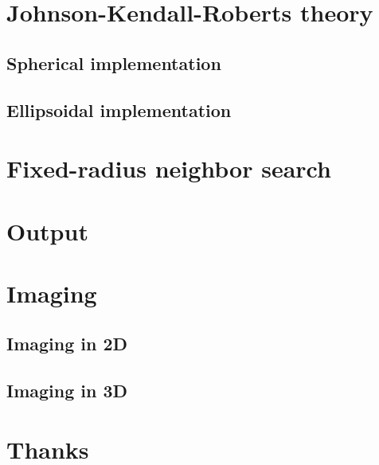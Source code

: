 \documentclass[12pt]{article}
\begin{document}
    \section{Johnson-Kendall-Roberts theory}\label{sec:jkr}

    \subsection{Spherical implementation}\label{subsec:sphere}

    \subsection{Ellipsoidal implementation}\label{subsec:ellipse}

    \section{Fixed-radius neighbor search}\label{sec:fixed}

    \section{Output}

    \section{Imaging}\label{sec:imaging}

    \subsection{Imaging in 2D}\label{subsec:2d}

    \subsection{Imaging in 3D}\label{subsec:3d}

    \section{Thanks}
\end{document}
